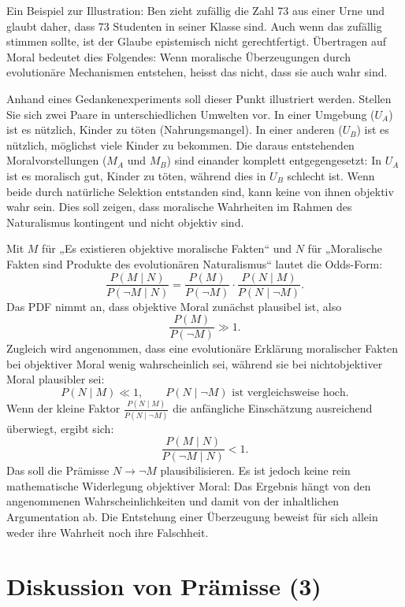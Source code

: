 \documentclass[11pt,a4paper]{article}
\begin{document}
	Ein Beispiel zur Illustration: Ben zieht zufällig die Zahl 73 aus einer Urne und glaubt daher, dass 73 Studenten in seiner Klasse sind. Auch wenn das zufällig stimmen sollte, ist der Glaube epistemisch nicht gerechtfertigt. Übertragen auf Moral bedeutet dies Folgendes: Wenn moralische Überzeugungen durch evolutionäre Mechanismen entstehen, heisst das nicht, dass sie auch wahr sind.
	
	Anhand eines Gedankenexperiments soll dieser Punkt illustriert werden. Stellen Sie sich zwei Paare in unterschiedlichen Umwelten vor. In einer Umgebung (\(U_A\)) ist es nützlich, Kinder zu töten (Nahrungsmangel). In einer anderen (\(U_B\)) ist es nützlich, möglichst viele Kinder zu bekommen. Die daraus entstehenden Moralvorstellungen (\(M_A\) und \(M_B\)) sind einander komplett entgegengesetzt: In \(U_A\) ist es moralisch gut, Kinder zu töten, während dies in \(U_B\) schlecht ist. Wenn beide durch natürliche Selektion entstanden sind, kann keine von ihnen objektiv wahr sein. Dies soll zeigen, dass moralische Wahrheiten im Rahmen des Naturalismus kontingent und nicht objektiv sind.
	
	\begin{tcolorbox}[title=Mathematische Box: Bayes' Theorem und Prämisse (2)]
		Mit \(M\) für „Es existieren objektive moralische Fakten“ und \(N\) für „Moralische Fakten sind Produkte des evolutionären Naturalismus“ lautet die Odds-Form:
		\[
		\frac{P(M\mid N)}{P(\neg M\mid N)}
		=
		\frac{P(M)}{P(\neg M)}
		\cdot
		\frac{P(N\mid M)}{P(N\mid\neg M)}.
		\]
		Das PDF nimmt an, dass objektive Moral zunächst plausibel ist, also
		\[
		\frac{P(M)}{P(\neg M)}\gg 1.
		\]
		Zugleich wird angenommen, dass eine evolutionäre Erklärung moralischer Fakten bei objektiver Moral wenig wahrscheinlich sei, während sie bei nichtobjektiver Moral plausibler sei:
		\[
		P(N\mid M)\ll 1,\qquad P(N\mid\neg M)\text{ ist vergleichsweise hoch}.
		\]
		Wenn der kleine Faktor \(\frac{P(N\mid M)}{P(N\mid\neg M)}\) die anfängliche Einschätzung ausreichend überwiegt, ergibt sich:
		\[
		\frac{P(M\mid N)}{P(\neg M\mid N)}<1.
		\]
		Das soll die Prämisse \(N\rightarrow\neg M\) plausibilisieren. Es ist jedoch keine rein mathematische Widerlegung objektiver Moral: Das Ergebnis hängt von den angenommenen Wahrscheinlichkeiten und damit von der inhaltlichen Argumentation ab. Die Entstehung einer Überzeugung beweist für sich allein weder ihre Wahrheit noch ihre Falschheit.
	\end{tcolorbox}
	
	\section{Diskussion von Prämisse (3)}
	
\end{document}
